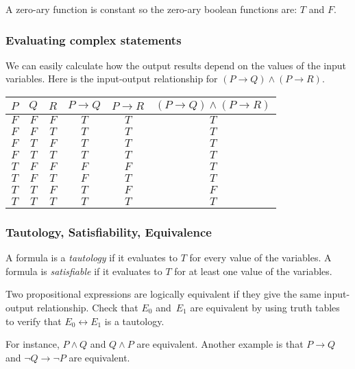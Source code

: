 \documentclass[10pt,t]{beamer}
\begin{document}
\begin{frame}
\pause
\bigskip
A zero-ary function is constant so the zero-ary boolean functions are:
$T$ and $F$.
\end{frame}




\begin{frame}
  \frametitle{Evaluating complex statements}
  We can easily calculate how the output results 
  depend on the values of the input variables.
  \pause
  Here is the input-output relationship for
  $(P\rightarrow Q)\wedge (P\rightarrow R)$.
  \begin{center}
    \begin{tabular}{ccc|ccc}
      $P$  &$Q$  &$R$ &$P\rightarrow Q$ &$P\rightarrow R$ &$(P\rightarrow Q)\wedge (P\rightarrow R)$  \\ \hline
      $F$  &$F$  &$F$  &$T$  &$T$  &$T$   \\
      $F$  &$F$  &$T$  &$T$  &$T$  &$T$   \\
      $F$  &$T$  &$F$  &$T$  &$T$  &$T$   \\
      $F$  &$T$  &$T$  &$T$  &$T$  &$T$   \\
      $T$  &$F$  &$F$  &$F$  &$F$  &$T$   \\
      $T$  &$F$  &$T$  &$F$  &$T$  &$T$   \\
      $T$  &$T$  &$F$  &$T$  &$F$  &$F$   \\
      $T$  &$T$  &$T$  &$T$  &$T$  &$T$      
    \end{tabular}
  \end{center}
\end{frame}




\begin{frame}
  \frametitle{Tautology, Satisfiability, Equivalence}
  A formula is a \emph{tautology} if it evaluates to $T$ for every value
  of the variables.
  A formula is \emph{satisfiable} if it evaluates to $T$ for at least one
  value of the variables.

  \pause
  Two propositional expressions are \alert{logically equivalent} if they
  give the same input-output relationship. 
  Check that $E_0$ and~$E_1$ are equivalent by using truth tables to
  verify that  
  $E_0\leftrightarrow E_1$ is a tautology.  

  For instance, $P\wedge Q$ and $Q\wedge P$ are equivalent.
  Another example is that $P\rightarrow Q$ and $\neg Q\rightarrow \neg P$ 
  are equivalent.
\end{frame}
\end{document}

